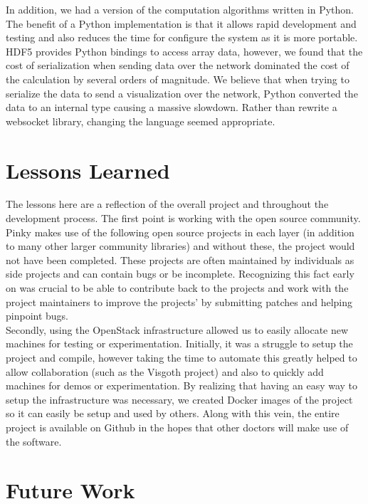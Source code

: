 In addition, we had a version of the computation algorithms written in Python.
The benefit of a Python implementation is that it allows rapid development and
testing and also reduces the time for configure the system as it is more
portable. HDF5 provides Python bindings to access array data, however, we found
that the cost of serialization when sending data over the network dominated the
cost of the calculation by several orders of magnitude.  We believe that when
trying to serialize the data to send a visualization over the network,
Python converted the data to an internal type causing a massive slowdown.
Rather than rewrite a websocket library, changing the language seemed
appropriate.

\section{Lessons Learned}

The lessons here are a reflection of the overall project and throughout the
development process. The first point is working with the open source community.
Pinky makes use of the following open source projects \cite{edflib}
\cite{dropbox-json} \cite{websocket-server} \cite{tiledb} \cite{happyhttp} in
each layer (in addition to many other larger community libraries) and without
these, the project would not have been completed. These projects are often
maintained by individuals as side projects and can contain bugs or be
incomplete. Recognizing this fact early on was crucial to be able to contribute
back to the projects and work with the project maintainers to improve the
projects' by submitting patches and helping pinpoint bugs. \\

Secondly, using the OpenStack infrastructure allowed us to easily allocate new
machines for testing or experimentation. Initially, it was a struggle to setup
the project and compile, however taking the time to automate this greatly
helped to allow collaboration (such as the Visgoth project) and also to quickly
add machines for demos or experimentation. By realizing that having an easy way
to setup the infrastructure was necessary, we created Docker \cite{docker}
images of the project so it can easily be setup and used by others. Along with
this vein, the entire project is available on Github \cite{eeg-toolkit} in the
hopes that other doctors will make use of the software.

\section{Future Work}\label{discuss-ch:future-work}

